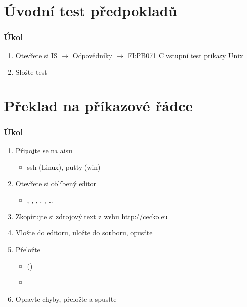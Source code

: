 \section{Úvodní test předpokladů}
\frame{\sectionpage}

\begin{frame}
  \frametitle{Úkol}

  \begin{enumerate}
    \item Otevřete si IS $\rightarrow$ Odpovědníky $\rightarrow$ FI:PB071 C
    vstupní test prikazy Unix
    \item Složte test
  \end{enumerate}
\end{frame}

\section{Překlad na příkazové řádce}
\frame{\sectionpage}

\begin{frame}
  \frametitle{Úkol}

  \begin{enumerate}
    \item Připojte se na aisu
    \begin{itemize}
      \item ssh (Linux), putty (win)
    \end{itemize}

    \item Otevřete si oblíbený editor
    \begin{itemize}
      \item {}, , , , , \dots
    \end{itemize}

    \item Zkopírujte si zdrojový text z webu \url{http://cecko.eu}
    \item Vložte do editoru, uložte do souboru, opusťte
    \item Přeložte
    \begin{itemize}
      \item {} ()
      \item {}
    \end{itemize}

    \item Opravte chyby, přeložte a spusťte

  \end{enumerate}
\end{frame}

